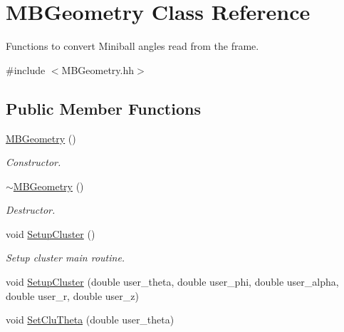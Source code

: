 \hypertarget{class_m_b_geometry}{}\section{M\+B\+Geometry Class Reference}
\label{class_m_b_geometry}


Functions to convert Miniball angles read from the frame.  




{\ttfamily \#include $<$M\+B\+Geometry.\+hh$>$}

\subsection*{Public Member Functions}
\begin{DoxyCompactItemize}
\item 
\mbox{\label{class_m_b_geometry_a47eba401cd9bb4452df2f812c6a7e446}} 
\hyperlink{class_m_b_geometry_a47eba401cd9bb4452df2f812c6a7e446}{M\+B\+Geometry} ()
\begin{DoxyCompactList}\small\item\em Constructor. \end{DoxyCompactList}\item 
\mbox{\label{class_m_b_geometry_a6359b9d13d3b062ac2153087fc1b172b}} 
\hyperlink{class_m_b_geometry_a6359b9d13d3b062ac2153087fc1b172b}{$\sim$\+M\+B\+Geometry} ()
\begin{DoxyCompactList}\small\item\em Destructor. \end{DoxyCompactList}\item 
\mbox{\label{class_m_b_geometry_a4d98a38f0dc1ca6a4a73477dde5cdd8d}} 
void \hyperlink{class_m_b_geometry_a4d98a38f0dc1ca6a4a73477dde5cdd8d}{Setup\+Cluster} ()
\begin{DoxyCompactList}\small\item\em Setup cluster main routine. \end{DoxyCompactList}\item 
void \hyperlink{class_m_b_geometry_ac3751c8eb94c051b402c30cb14cba462}{Setup\+Cluster} (double user\+\_\+theta, double user\+\_\+phi, double user\+\_\+alpha, double user\+\_\+r, double user\+\_\+z)
\item 
void \hyperlink{class_m_b_geometry_a9a2a8c9609141be92d7ba30e6087aa30}{Set\+Clu\+Theta} (double user\+\_\+theta)

\end{DoxyCompactItemize}
